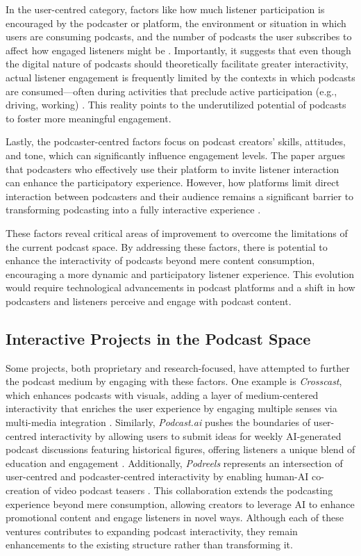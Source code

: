 \documentclass[12pt]{report}
\begin{document}
\begin{myfont}
        \indent In the user-centred category, factors like how much listener participation is encouraged by the podcaster or platform, the environment or situation in which users are consuming podcasts, and the number of podcasts the user subscribes to affect how engaged listeners might be \citep{GarciaMarin2020}. Importantly, it suggests that even though the digital nature of podcasts should theoretically facilitate greater interactivity, actual listener engagement is frequently limited by the contexts in which podcasts are consumed—often during activities that preclude active participation (e.g., driving, working) \citep{GarciaMarin2020}. This reality points to the underutilized potential of podcasts to foster more meaningful engagement.
        
        \indent Lastly, the podcaster-centred factors focus on podcast creators' skills, attitudes, and tone, which can significantly influence engagement levels. The paper argues that podcasters who effectively use their platform to invite listener interaction can enhance the participatory experience. However, how platforms limit direct interaction between podcasters and their audience remains a significant barrier to transforming podcasting into a fully interactive experience \citep{GarciaMarin2020}.
        
        \indent These factors reveal critical areas of improvement to overcome the limitations of the current podcast space. By addressing these factors, there is potential to enhance the interactivity of podcasts beyond mere content consumption, encouraging a more dynamic and participatory listener experience. This evolution would require technological advancements in podcast platforms and a shift in how podcasters and listeners perceive and engage with podcast content.\\
        \subsection{Interactive Projects in the Podcast Space}
        \indent Some projects, both proprietary and research-focused, have attempted to further the podcast medium by engaging with these factors. One example is \textit{Crosscast}, which enhances podcasts with visuals, adding a layer of medium-centered interactivity that enriches the user experience by engaging multiple senses via multi-media integration \citep{Crosscast}. Similarly, \textit{Podcast.ai} pushes the boundaries of user-centred interactivity by allowing users to submit ideas for weekly AI-generated podcast discussions featuring historical figures, offering listeners a unique blend of education and engagement \citep{PodcastAI2023}. Additionally, \textit{Podreels} represents an intersection of user-centred and podcaster-centred interactivity by enabling human-AI co-creation of video podcast teasers \citep{wang2024podreels}. This collaboration extends the podcasting experience beyond mere consumption, allowing creators to leverage AI to enhance promotional content and engage listeners in novel ways. Although each of these ventures contributes to expanding podcast interactivity, they remain enhancements to the existing structure rather than transforming it.
        

\end{myfont}
\end{document}
